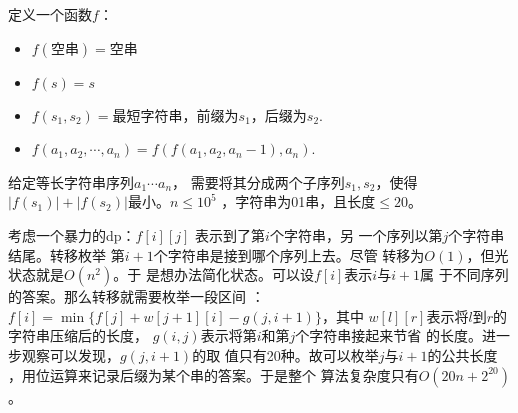 \begin{prob}
	定义一个函数$f$：
	\begin{itemize}
		\item $f(\text{空串})=\text{空串}$
		\item $f(s) = s$
		\item $f(s_1, s_2) = \text{最短字符串，前缀为$s_1$，后缀为$s_2$}$. 
		\item $f(a_1, a_2, \cdots, a_n) = f(f(a_1, a_2, a_n - 1), a_n)$.
	\end{itemize}
	给定等长字符串序列$a_1 \cdots a_n$，
	需要将其分成两个子序列$s_1,s_2$，使得
	$|f(s_1)|+|f(s_2)|$最小。$n \le 10^5$
	，字符串为01串，且长度$ \le 20$。
\end{prob}

\begin{sol}
	考虑一个暴力的dp：$f[i][j]$
	表示到了第$i$个字符串，另
	一个序列以第$j$个字符串结尾。转移枚举
	第$i+1$个字符串是接到哪个序列上去。尽管
	转移为$O(1)$，但光状态就是$O(n^2)$。于
	是想办法简化状态。可以设$f[i]$表示$i$与$i+1$属
	于不同序列的答案。那么转移就需要枚举一段区间
	：$f[i]=\min\{f[j]+w[j+1][i]-g(j,i+1)\}$，其中
	$w[l][r]$表示将$l$到$r$的字符串压缩后的长度，
	$g(i,j)$表示将第$i$和第$j$个字符串接起来节省
	的长度。进一步观察可以发现，$g(j,i+1)$的取
	值只有20种。故可以枚举$j$与$i+1$的公共长度
	，用位运算来记录后缀为某个串的答案。于是整个
	算法复杂度只有$O(20n+2^{20})$。
\end{sol}

